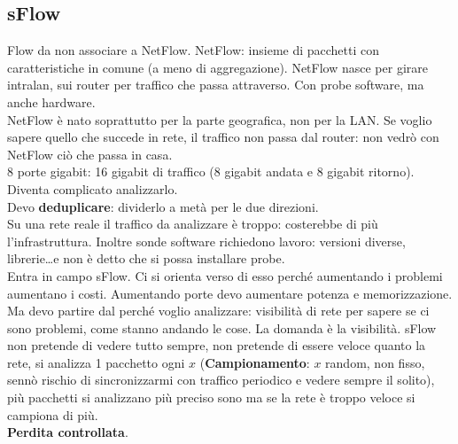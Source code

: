 \documentclass[10pt]{book}
\begin{document}
\subsection{sFlow}
Flow da non associare a NetFlow. NetFlow: insieme di pacchetti con caratteristiche in comune (a meno di aggregazione). NetFlow nasce per girare intralan, sui router per traffico che passa attraverso. Con probe software, ma anche hardware.\\
NetFlow è nato soprattutto per la parte geografica, non per la LAN. Se voglio sapere quello che succede in rete, il traffico non passa dal router: non vedrò con NetFlow ciò che passa in casa.\\
8 porte gigabit: 16 gigabit di traffico (8 gigabit andata e 8 gigabit ritorno). Diventa complicato analizzarlo.\\
Devo \textbf{deduplicare}: dividerlo a metà per le due direzioni.\\
Su una rete reale il traffico da analizzare è troppo: costerebbe di più l'infrastruttura. Inoltre sonde software richiedono lavoro: versioni diverse, librerie\ldots e non è detto che si possa installare probe.\\
Entra in campo sFlow. Ci si orienta verso di esso perché aumentando i problemi aumentano i costi. Aumentando porte devo aumentare potenza e memorizzazione. Ma devo partire dal perché voglio analizzare: visibilità di rete per sapere se ci sono problemi, come stanno andando le cose. La domanda è la visibilità. sFlow non pretende di vedere tutto sempre, non pretende di essere veloce quanto la rete, si analizza 1 pacchetto ogni $x$ (\textbf{Campionamento}: $x$ random, non fisso, sennò rischio di sincronizzarmi con traffico periodico e vedere sempre il solito), più pacchetti si analizzano più preciso sono ma se la rete è troppo veloce si campiona di più.\\
\textbf{Perdita controllata}.
\end{document}
